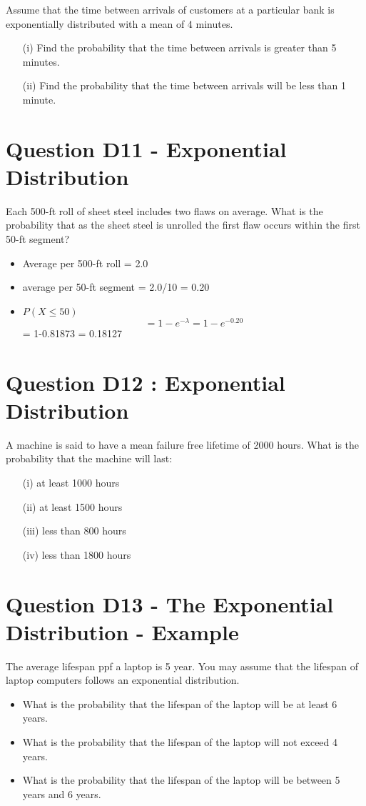 \documentclass[]{report}
\begin{document}
	

Assume that the time between arrivals of customers at a particular bank is exponentially distributed with a mean of 4 minutes. 

\begin{itemize}
	\item[(i)]
	Find the probability that the time between arrivals is greater than 5 minutes.
	\item[(ii)]
	Find the probability that the time between arrivals will be less than 1 minute.
\end{itemize}


\section*{Question D11 - Exponential Distribution}
Each 500-ft roll of sheet steel includes two flaws on average. 
What is the probability that as the sheet steel is unrolled the first flaw occurs within the first 50-ft segment?


\begin{itemize}
	\item Average per 500-ft roll = 2.0
	\item average per 50-ft segment = 2.0/10 = 0.20
	\item $P(X \leq 50)$
	\[ = 1 - e^{-\lambda} = 1 - e^{-0.20}\] = 1-0.81873 = 0.18127
\end{itemize}


\section{Question D12 : Exponential Distribution}

A machine is said to have a mean failure free lifetime of 2000 hours. What is the probability that the machine will last:

\begin{itemize}
	\item[(i)]	at least 1000 hours
	\item[(ii)]	at least 1500 hours
	\item[(iii)]	less than 800 hours
	\item[(iv)]	less than 1800 hours
\end{itemize}
\section{Question D13 -  The Exponential Distribution - Example}
The average lifespan ppf a laptop is 5 year. You may assume that the lifespan of laptop computers follows an exponential distribution.
\begin{itemize}
	\item What is the probability that the lifespan of the laptop will be at least 6 years.
	\item What is the probability that the lifespan of the laptop will not exceed 4 years.
	\item What is the probability that the lifespan of the laptop will be between 5 years and 6 years.
\end{itemize}
\end{document}
